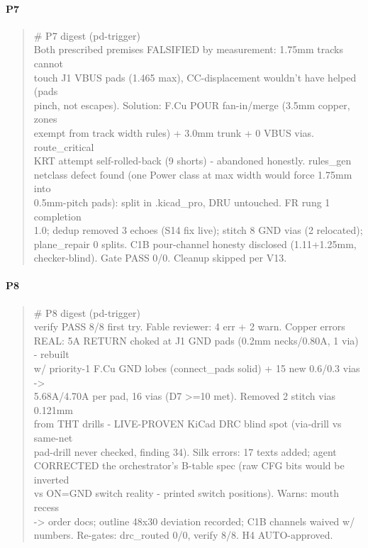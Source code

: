 \documentclass[11pt,a4paper]{article}
\begin{document}
\paragraph*{P7}
\begin{quote}\small\ttfamily\raggedright
\# P7 digest (pd-trigger)\\
Both prescribed premises FALSIFIED by measurement: 1.75mm tracks cannot\\
touch J1 VBUS pads (1.465 max), CC-displacement wouldn't have helped (pads\\
pinch, not escapes). Solution: F.Cu POUR fan-in/merge (3.5mm copper, zones\\
exempt from track width rules) + 3.0mm trunk + 0 VBUS vias. route\_critical\\
KRT attempt self-rolled-back (9 shorts) - abandoned honestly. rules\_gen\\
netclass defect found (one Power class at max width would force 1.75mm into\\
0.5mm-pitch pads): split in .kicad\_pro, DRU untouched. FR rung 1 completion\\
1.0; dedup removed 3 echoes (S14 fix live); stitch 8 GND vias (2 relocated);\\
plane\_repair 0 splits. C1B pour-channel honesty disclosed (1.11+1.25mm,\\
checker-blind). Gate PASS 0/0. Cleanup skipped per V13.
\end{quote}
\paragraph*{P8}
\begin{quote}\small\ttfamily\raggedright
\# P8 digest (pd-trigger)\\
verify PASS 8/8 first try. Fable reviewer: 4 err + 2 warn. Copper errors\\
REAL: 5A RETURN choked at J1 GND pads (0.2mm necks/0.80A, 1 via) - rebuilt\\
w/ priority-1 F.Cu GND lobes (connect\_pads solid) + 15 new 0.6/0.3 vias -\textgreater{}\\
5.68A/4.70A per pad, 16 vias (D7 \textgreater{}=10 met). Removed 2 stitch vias 0.121mm\\
from THT drills - LIVE-PROVEN KiCad DRC blind spot (via-drill vs same-net\\
pad-drill never checked, finding 34). Silk errors: 17 texts added; agent\\
CORRECTED the orchestrator's B-table spec (raw CFG bits would be inverted\\
vs ON=GND switch reality - printed switch positions). Warns: mouth recess\\
-\textgreater{} order docs; outline 48x30 deviation recorded; C1B channels waived w/\\
numbers. Re-gates: drc\_routed 0/0, verify 8/8. H4 AUTO-approved.
\end{quote}
\end{document}
